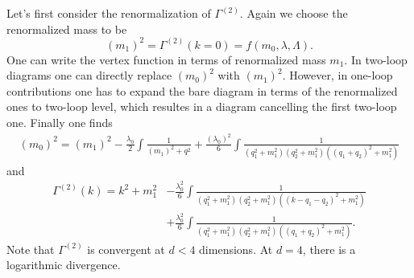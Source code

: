 \documentclass[submission, PhysLectNotes]{SciPost}
\begin{document}
Let's first consider the renormalization of $\Gamma^{(2)}$. Again we choose the renormalized mass to be 
\begin{equation}
	\left(m_1\right)^2 = \Gamma^{(2)}(k=0) = f(m_0, \lambda, \Lambda).
\end{equation}
One can write the vertex function in terms of renormalized mass $m_1$. In two-loop diagrams one can directly replace $\left(m_0\right)^2$ with $\left(m_1\right)^2$. However, in one-loop contributions one has to expand the bare diagram in terms of the renormalized ones to two-loop level, which resultes in a diagram cancelling the first two-loop one. Finally one finds
\begin{equation}
	\begin{aligned}
		\left(m_0\right)^2 = \left(m_1\right)^2 - \frac{\lambda_0}{2} \int \frac{1}{\left(m_1\right)^2+q^2} + \frac{\left(\lambda_0\right)^2}{6} \int \frac{1}{\left(q_1^2+m_1^2\right)\left(q_2^2+m_1^2\right)\left(\left(q_1+q_2\right)^2+m_1^2\right)}
	\end{aligned}
\end{equation} 
and 
\begin{equation}
	\begin{aligned}
		\Gamma^{(2)}(k) = k^2 + m_1^2 &- \frac{\lambda_0^2}{6} \int \frac{1}{\left(q_1^2+m_1^2\right)\left(q_2^2+m_1^2\right)\left(\left(k-q_1-q_2\right)^2+m_1^2\right)} \\
		& + \frac{\lambda_0^2}{6} \int \frac{1}{\left(q_1^2+m_1^2\right)\left(q_2^2+m_1^2\right)\left(\left(q_1+q_2\right)^2+m_1^2\right)}.
	\end{aligned}
\end{equation}
Note that $\Gamma^{(2)}$ is convergent at $d<4$ dimensions. At $d=4$, there is a logarithmic divergence. 
\end{document}
